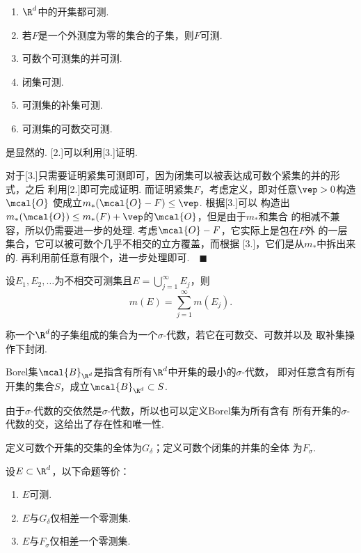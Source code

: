   \begin{pos}[可测集的性质]
    $\,$
    \begin{enumerate}
      \item $\R^d$中的开集都可测.
      \item 若$F$是一个外测度为零的集合的子集，则$F$可测.
      \item 可数个可测集的并可测.
      \item 闭集可测.
      \item 可测集的补集可测.
      \item 可测集的可数交可测.
    \end{enumerate}
  \end{pos}
  \proof
    [1.]是显然的. [2.]可以利用[3.]证明. \par
    对于[3.]只需要证明紧集可测即可，因为闭集可以被表达成可数个紧集的并的形式，之后
    利用[2.]即可完成证明. 而证明紧集$F$，考虑定义，即对任意$\vep>0$构造$\mcal{O}$
    使成立$m_*(\mcal{O}-F)\le\vep$. 根据[3.]可以
    构造出$m_*(\mcal{O})\le m_*(F)+\vep$的$\mcal{O}$，但是由于$m_*$和集合
    的相减不兼容，所以仍需要进一步的处理. 考虑$\mcal{O}-F$，它实际上是包在$F$外
    的一层集合，它可以被可数个几乎不相交的立方覆盖，而根据
    [3.]，它们是从$m_*$中拆出来的. 再利用前任意有限个，进一步处理即可.$\quad\blacksquare$

  \begin{thm}
    设$E_1,E_2,\dots$为不相交可测集且$E=\bigcup_{j=1}^\infty E_j$，则
    \[
      m(E) = \sum_{j=1}^\infty m(E_j).
    \]
  \end{thm}

  \begin{defi}[$\sigma$-代数]
    称一个$\R^d$的子集组成的集合为一个$\sigma$-代数，若它在可数交、可数并以及
    取补集操作下封闭.
  \end{defi}

  \begin{defi}[Borel集]
    Borel集$\mcal{B}_{\R^d}$是指含有所有$\R^d$中开集的最小的$\sigma$-代数，
    即对任意含有所有开集的集合$S$，成立$\mcal{B}_{\R^d}\subset S$.
  \end{defi}
  \remark
    由于$\sigma$-代数的交依然是$\sigma$-代数，所以也可以定义Borel集为所有含有
    所有开集的$\sigma$-代数的交，这给出了存在性和唯一性.

  \begin{defi}
    定义可数个开集的交集的全体为$G_{\delta}$；定义可数个闭集的并集的全体
    为$F_{\sigma}$.
  \end{defi}

  \begin{pos}
    设$E\subset\R^d$，以下命题等价：
    \begin{enumerate}
      \item $E$可测.
      \item $E$与$G_\delta$仅相差一个零测集.
      \item $E$与$F_\sigma$仅相差一个零测集.
    \end{enumerate}
  \end{pos}



